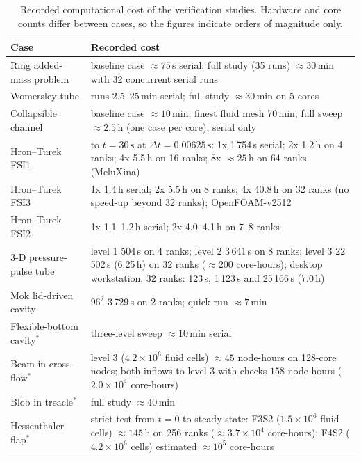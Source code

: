 \begin{table}[htbp]
	\centering
	\footnotesize
	\setlength{\tabcolsep}{3pt}
	\caption{Recorded computational cost of the verification studies. Hardware and core counts differ between cases, so the figures indicate orders of magnitude only.}
	\label{tab:cost}
	\begin{tabular}{p{3.0cm}p{10.8cm}}
		\toprule
		Case & Recorded cost \\
		\midrule
		Ring added-mass problem & baseline case $\approx75$\,s serial; full study (35 runs) $\approx30$\,min with 32 concurrent serial runs \\
		Womersley tube & runs 2.5--25\,min serial; full study $\approx30$\,min on 5 cores \\
		Collapsible channel & baseline case $\approx10$\,min; finest fluid mesh 70\,min; full sweep $\approx2.5$\,h (one case per core); serial only \\
		Hron--Turek FSI1 & to $t = 30\,\mathrm{s}$ at $\Delta t = 0.00625\,\mathrm{s}$: 1x 1\,754\,s serial; 2x 1.2\,h on 4 ranks; 4x 5.5\,h on 16 ranks; 8x $\approx25$\,h on 64 ranks (MeluXina) \\
		Hron--Turek FSI3 & 1x 1.4\,h serial; 2x 5.5\,h on 8 ranks; 4x 40.8\,h on 32 ranks (no speed-up beyond 32 ranks); OpenFOAM-v2512 \\
		Hron--Turek FSI2 & 1x 1.1--1.2\,h serial; 2x 4.0--4.1\,h on 7--8 ranks \\
		3-D pressure-pulse tube & level 1 504\,s on 4 ranks; level 2 3\,641\,s on 8 ranks; level 3 22\,502\,s (6.25\,h) on 32 ranks ($\approx200$ core-hours); desktop workstation, 32 ranks: 123\,s, 1\,123\,s and 25\,166\,s (7.0\,h) \\
		Mok lid-driven cavity & $96^2$ 3\,729\,s on 2 ranks; quick run $\approx7$\,min \\
		Flexible-bottom cavity$^\ast$ & three-level sweep $\approx10$\,min serial \\
		Beam in cross-flow$^\ast$ & level 3 ($4.2\times10^{6}$ fluid cells) $\approx45$ node-hours on 128-core nodes; both inflows to level 3 with checks $158$ node-hours ($2.0\times10^{4}$ core-hours) \\
		Blob in treacle$^\ast$ & full study $\approx40$\,min \\
		Hessenthaler flap$^\ast$ & strict test from $t=0$ to steady state: F3S2 ($1.5\times10^{6}$ fluid cells) $\approx145$\,h on 256 ranks ($\approx3.7\times10^{4}$ core-hours); F4S2 ($4.2\times10^{6}$ cells) estimated $\approx10^{5}$ core-hours \\
		\bottomrule
	\end{tabular}
\end{table}

